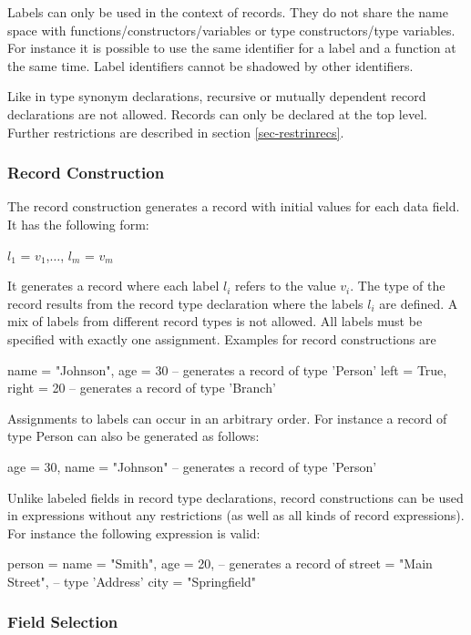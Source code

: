 \documentclass[11pt,fleqn]{article}
\renewcommand{\tt}{\usefont{OT1}{cmtt}{m}{n}\selectfont}
\newcommand{\codefont}{\small\tt}
\newcommand{\code}[1]{\mbox{\codefont #1}}
\begin{document}
Labels can only be used in the context of
records. They do not share the name space with 
functions/constructors/variables or type constructors/type variables. 
For instance it is possible to use 
the same identifier for a label and a function at the same time. Label
identifiers cannot be shadowed by other identifiers.

Like in type synonym declarations, recursive or mutually 
dependent record declarations are not allowed. Records can only
be declared at the top level. Further restrictions are described in
section \ref{sec-restrinrecs}.


\subsubsection{Record Construction}
\label{sec-recordconstr}

The record construction generates a record with initial values for
each data field. It has the following form:
\begin{curry}
{ $l_1$ = $v_1$,$\ldots$, $l_m$ = $v_m$ }
\end{curry}
It generates a record where each label $l_i$ refers to the
value $v_i$. The type of the record results from the record type
declaration where the labels $l_i$ are defined.
A mix of labels from different
record types is not allowed. All labels must be specified with 
exactly one assignment. Examples for record constructions are
\begin{curry}
{name = "Johnson", age = 30}     -- generates a record of type 'Person'
{left = True, right = 20}        -- generates a record of type 'Branch'
\end{curry}
Assignments to labels can occur in an arbitrary order. For instance a
record of type \code{Person} can also be generated as follows:
\begin{curry}
{age = 30, name = "Johnson"}     -- generates a record of type 'Person'
\end{curry}
Unlike labeled fields in record type declarations, 
record constructions can be used in expressions without any restrictions
(as well as all kinds of record expressions). For instance the following
expression is valid:
\begin{curry}
{person = {name = "Smith", age = 20},   -- generates a record of
 street = "Main Street",                -- type 'Address'
 city   = "Springfield"}
\end{curry}


\subsubsection{Field Selection}
\label{sec-fieldsel}
\end{document}
